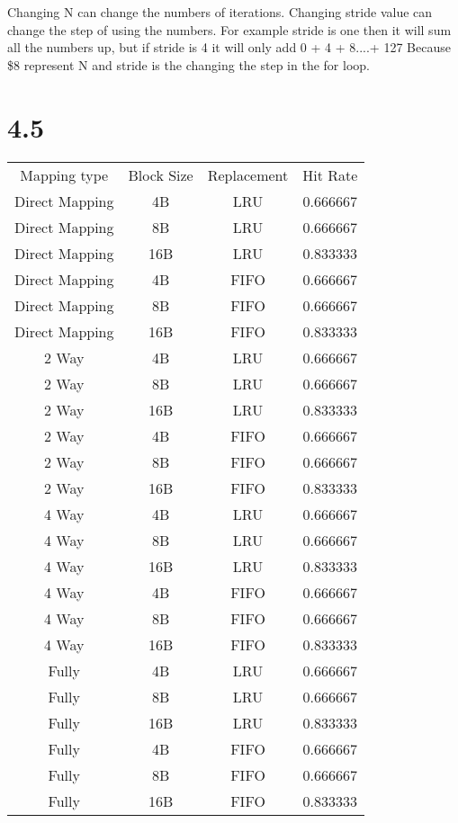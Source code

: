 \documentclass[]{article}
\begin{document}
Changing N can change the numbers of iterations. Changing stride value can change the step of using the numbers. For example stride is one then it will sum all the numbers up, but if stride is 4 it will only add 0 + 4 + 8....+ 127\newline
Because \$8 represent N and stride is the changing the step in the for loop.\newline
\section*{4.5}
\begin{center}
	\begin{tabular}{c c c c}
	Mapping type & Block Size &  Replacement & Hit Rate\\
	Direct Mapping & 4B    &LRU&	0.666667\\
	Direct Mapping & 8B    &LRU&    0.666667\\
	Direct Mapping & 16B    &LRU&    0.833333\\
	Direct Mapping & 4B    &FIFO&	0.666667\\
	Direct Mapping & 8B    &FIFO&    0.666667\\
	Direct Mapping & 16B    &FIFO&    0.833333\\
	2 Way          & 4B    &LRU&     0.666667\\
	2 Way          & 8B    &LRU&     0.666667\\
	2 Way          & 16B    &LRU&    0.833333\\
	2 Way          & 4B    &FIFO&     0.666667\\
	2 Way          & 8B    &FIFO&     0.666667\\
	2 Way          & 16B    &FIFO&     0.833333\\
	4 Way          & 4B    &LRU&     0.666667\\
	4 Way          & 8B    &LRU&     0.666667\\	
	4 Way          & 16B   &LRU&     0.833333\\
	4 Way          & 4B    &FIFO&     0.666667\\
	4 Way          & 8B    &FIFO&     0.666667\\	
	4 Way          & 16B   &FIFO&     0.833333\\
	Fully          & 4B    &LRU&     0.666667\\
	Fully          & 8B    &LRU&     0.666667\\
	Fully          & 16B    &LRU&     0.833333\\
    Fully          & 4B    &FIFO&     0.666667\\
    Fully          & 8B    &FIFO&     0.666667\\
    Fully          & 16B    &FIFO&     0.833333\\
	\end{tabular}
\end{center}
\end{document}
